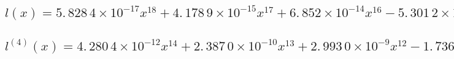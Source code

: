 \documentclass{article}
\begin{document}
\subsection{$l(x)=5.\,\allowbreak 828\,4\times
10^{-17}x^{18}+4.\,\allowbreak 178\,9\times 10^{-15}\allowbreak
x^{17}+6.\,\allowbreak 852\times 10^{-14}x^{16}-5.\,\allowbreak 301\,2\times
10^{-13}\allowbreak x^{15}-1.\,\allowbreak 056\,9\times
10^{-11}x^{14}+2.\,\allowbreak 779\,7\times 10^{-11}\allowbreak
x^{13}+7.\,\allowbreak 320\,3\times 10^{-10}x^{12}-3.\,\allowbreak
166\,6\times 10^{-10}\allowbreak x^{11}-2.\,\allowbreak 573\,3\times
10^{-8}x^{10}-4.\,\allowbreak 766\,1\times 10^{-8}\allowbreak
x^{9}-5.\,\allowbreak 281\,3\times 10^{-7}x^{8}+2.\,\allowbreak 297\,6\times
10^{-6}\allowbreak x^{7}+6.\,\allowbreak 888\,9\times
10^{-5}x^{6}-1.\,\allowbreak 498\,7\times 10^{-5}\allowbreak
x^{5}-2.\,\allowbreak 194\,1\times 10^{-3}x^{4}-2.\,\allowbreak 378\,5\times
10^{-3}\allowbreak x^{3}+6.\,\allowbreak 502\,8\times
10^{-3}x^{2}-2.\,\allowbreak 042\,2\times 10^{-4}\allowbreak
x+3.\,\allowbreak 209\,1$}

\subsection{$l^{(4)}(x)=\allowbreak 4.\,\allowbreak 280\,4\times
10^{-12}x^{14}+2.\,\allowbreak 387\,0\times 10^{-10}\allowbreak
x^{13}+2.\,\allowbreak 993\,0\times 10^{-9}x^{12}-1.\,\allowbreak
736\,7\times 10^{-8}\allowbreak x^{11}-2.\,\allowbreak 539\,1\times
10^{-7}x^{10}+4.\,\allowbreak 770\,0\times 10^{-7}\allowbreak
x^{9}+8.\,\allowbreak 696\,5\times 10^{-6}x^{8}-2.\,\allowbreak 507\,9\times
10^{-6}x^{7}-\allowbreak 1.\,\allowbreak 296\,9\times
10^{-4}x^{6}-1.\,\allowbreak 441\,3\times 10^{-4}x^{5}-\allowbreak
8.\,\allowbreak 872\,6\times 10^{-4}x^{4}+1.\,\allowbreak 930\,0\times
10^{-3}x^{3}+0.024\,8\allowbreak x^{2}-1.\,\allowbreak 798\,4\times
10^{-3}x-5.\,\allowbreak 265\,8\times 10^{-2}$}
\end{document}

